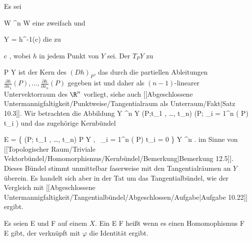 {

Es sei

\mavergleichskette
{\vergleichskette
{ W
}
{ \subseteq }{ \R^n
}
{  }{
}
{    }{
}
{   }{
}
}
{}{}{}
 { W } { \R
} {}
eine zweifach
und

\mavergleichskette
{\vergleichskette
{ Y
}
{ = }{ h^{-1}(c)
}
{  }{
}
{    }{
}
{   }{
}
}
{}{}{}
die
zu

\mavergleichskette
{\vergleichskette
{ c
}
{ \in }{ \R
}
{  }{
}
{    }{
}
{   }{
}
}
{}{}{,}
wobei $h$ in jedem Punkt von $Y$
sei. Der
$T_PY$ zu

\mavergleichskette
{\vergleichskette
{ P
}
{ \in }{ Y
}
{  }{
}
{    }{
}
{   }{
}
}
{}{}{}
ist der Kern des
$\left(D h \right)_{ P}$, das durch die partiellen Ableitungen ${ \frac{   \partial   h   }{  \partial   x_1   } } ( P) , \ldots , { \frac{   \partial   h   }{  \partial   x_n   } } ( P)$ gegeben ist und daher als $(n-1)$-linearer Untervektorraum des $\R^n$ vorliegt, siehe auch
[[Abgeschlossene Untermannigfaltigkeit/Punktweise/Tangentialraum als Unterraum/Fakt|Satz 10.3]].
Wir betrachten die Abbildung
\maabbeledisp {} {Y \times \R^n } { Y \times \R
} {(P;t_1 , \ldots , t_n) } { (P; \sum_{i = 1}^n {  } ( P)  t_i )
} {}
und das zugehörige Kernbündel

\mavergleichskettedisp
{\vergleichskette
{ E
}
{ =} { \left\{  (P; t_1 , \ldots , t_n)  \mid   P \in Y , \,  \sum_{i = 1}^n {  } ( P) t_i = 0       \right\}
}
{ \subseteq} { Y \times \R^n
}
{ } {
}
{ } {
}
}
{}{}{.}
im Sinne von
[[Topologischer Raum/Triviale Vektorbündel/Homomorphismus/Kernbündel/Bemerkung|Bemerkung 12.5]].
Dieses Bündel stimmt unmittelbar faserweise mit den Tangentialräumen an $Y$ überein. Es handelt sich aber in der Tat um das Tangentialbündel, wie der Vergleich mit
[[Abgeschlossene Untermannigfaltigkeit/Tangentialbündel/Abgeschlossen/Aufgabe|Aufgabe 10.22]]
ergibt.

}

{}
{

Es seien
\mathkor {} {E} {und} {F} {}
auf einem
$X$. Ein
\maabb {\varphi} { E } { F
} {}
heißt
wenn es einen Homomophismus
\maabb {\psi} { F } { E
} {}
gibt, der verknüpft mit $\varphi$
 {} {} die Identität ergibt.

}

